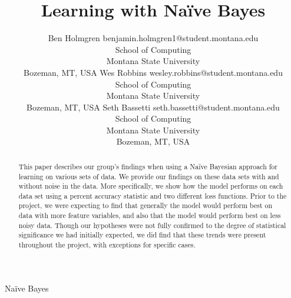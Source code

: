 \documentclass[twoside,11pt]{article}
\begin{document}
\title{Learning with Na{\"i}ve Bayes}

\author{\name Ben Holmgren \email benjamin.holmgren1@student.montana.edu \\
       \addr School of Computing\\
       Montana State University\\
       Bozeman, MT, USA
       \AND
       \name Wes Robbins \email wesley.robbins@student.montana.edu \\
       \addr School of Computing\\
       Montana State University\\
       Bozeman, MT, USA
       \AND
       \name Seth Bassetti \email seth.bassetti@student.montana.edu \\
       \addr School of Computing\\
       Montana State University\\
       Bozeman, MT, USA}

\maketitle

\begin{abstract}%
This paper describes our group's findings when using a Na{\"i}ve Bayesian
approach for learning on various sets of data. We provide our findings on
these data sets with and without noise in the data. More specifically, we show
how the model performs on each data set using a percent accuracy statistic
and two different loss functions. Prior to the project, we were expecting to find
that generally the model would perform best on data with more feature variables,
and also that the model would perform best on less noisy data. Though our
hypotheses were not fully confirmed to the degree of statistical significance
we had initially expected, we did find that these trends were present throughout
the project, with exceptions for specific cases.
\end{abstract}


\begin{keywords}
  Na{\"i}ve Bayes
\end{keywords}
\end{document}
